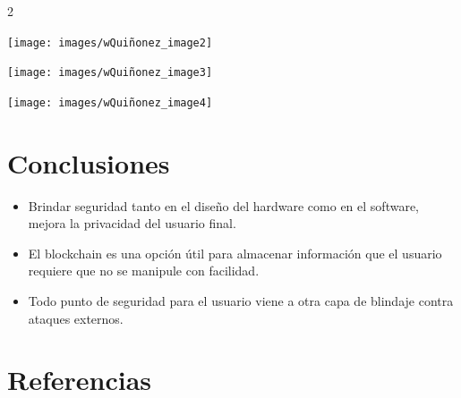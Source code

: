 \documentclass[12pt,spanish,Letterpaper,openany]{book}
\providecommand{\tightlist}{%
  \setlength{\itemsep}{0pt}\setlength{\parskip}{0pt}}
\begin{document}
\begin {multicols}{2}
\begin {flushleft}
\begin{minipage}[c]{\columnwidth}
\texttt{[image: images/wQuiñonez\_image2]}

\end{minipage}
\end {flushleft}

\begin {flushleft}
\noindent\begin{minipage}[c]{\columnwidth}

\texttt{[image: images/wQuiñonez\_image3]}

\end{minipage}
\end {flushleft}

\begin {flushleft}
\noindent\begin{minipage}[c]{\columnwidth}

\texttt{[image: images/wQuiñonez\_image4]}

\end{minipage}
\end {flushleft}

\hypertarget{conclusiones-8}{%
\section{Conclusiones}\label{conclusiones-8}}

\begin{itemize}
\item
  Brindar seguridad tanto en el diseño del hardware como en el software, mejora la privacidad del usuario final.
\item
  El blockchain es una opción útil para almacenar información que el usuario requiere que no se manipule con facilidad.
\end{itemize}

\hspace{1cm}

\begin{itemize}
\tightlist
\item
  Todo punto de seguridad para el usuario viene a otra capa de blindaje contra ataques externos.
\end{itemize}

\hypertarget{referencias-7}{%
\section{Referencias}\label{referencias-7}}


\end{multicols}
\end{document}
